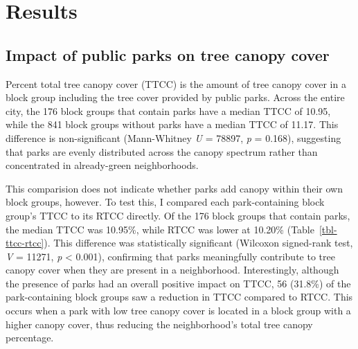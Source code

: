 \documentclass[
  sn-basic,
]{sn-jnl}
\begin{document}
\section{Results}\label{sec-results}

\subsection{Impact of public parks on tree canopy
cover}\label{sec-res-impact}

Percent total tree canopy cover (TTCC) is the amount of tree canopy
cover in a block group including the tree cover provided by public
parks. Across the entire city, the 176 block groups that contain parks
have a median TTCC of 10.95, while the 841 block groups without parks
have a median TTCC of 11.17. This difference is non-significant
(Mann-Whitney \emph{U} = 78897, \emph{p} = 0.168), suggesting that parks
are evenly distributed across the canopy spectrum rather than
concentrated in already-green neighborhoods.

This comparision does not indicate whether parks add canopy within their
own block groups, however. To test this, I compared each park-containing
block group's TTCC to its RTCC directly. Of the 176 block groups that
contain parks, the median TTCC was 10.95\%, while RTCC was lower at
10.20\% (Table~\ref{tbl-ttcc-rtcc}). This difference was statistically
significant (Wilcoxon signed-rank test, \emph{V} = 11271, \emph{p}
\textless{} 0.001), confirming that parks meaningfully contribute to
tree canopy cover when they are present in a neighborhood.
Interestingly, although the presence of parks had an overall positive
impact on TTCC, 56 (31.8\%) of the park-containing block groups saw a
reduction in TTCC compared to RTCC. This occurs when a park with low
tree canopy cover is located in a block group with a higher canopy
cover, thus reducing the neighborhood's total tree canopy percentage.
\end{document}
